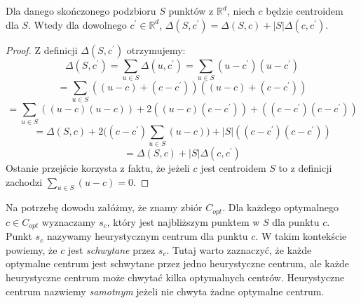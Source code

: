 \begin{lemma}{\cite{Arya2004LocalSH}}
    Dla danego skończonego podzbioru $S$ punktów z $\mathbb{R}^d$, niech $c$ będzie centroidem dla $S$. Wtedy dla dowolnego $c^{'} \in \mathbb{R}^d$, $\Delta(S, c^{'}) = \Delta(S, c) + |S|\Delta(c, c^{'})$.
\end{lemma}
\begin{proof}
    Z definicji $\Delta(S, c^{'})$ otrzymujemy:
    \begin{equation}
        \Delta(S, c^{'}) = \sum_{u \in S} \Delta(u, c^{'}) =  \sum_{u \in S} (u - c^{'}) (u - c^{'})
    \end{equation}
    \begin{equation}
         = \sum_{u \in S} ((u - c) + (c - c^{'})) ((u - c) + (c - c^{'}))
    \end{equation}
    \begin{equation}
        = \sum_{u \in S} ((u - c)(u - c)) + 2((u - c)(c - c^{'})) + ((c - c^{'})(c - c^{'}))
    \end{equation}
    \begin{equation}
        = \Delta(S, c) + 2\Big( (c - c^{'}) \sum_{u \in S} (u - c) \Big) + |S|((c - c^{'})(c - c^{'}))
    \end{equation}
    \begin{equation}
        = \Delta(S, c) + |S|\Delta(c,c^{'})
    \end{equation}
    Ostanie przejście korzysta z faktu, że jeżeli $c$ jest centroidem $S$ to z definicji zachodzi $\sum_{u \in S} (u - c) = 0$.
\end{proof}

\noindent
Na potrzebę dowodu załóżmy, że znamy zbiór $C_{opt}$.
Dla każdego optymalnego $c \in C_{opt}$ wyznaczamy $s_{c}$, który jest najbliższym punktem w $S$ dla punktu $c$.
Punkt $s_{c}$ nazywamy heurystycznym centrum dla punktu $c$.
W takim kontekście powiemy, że $c$ jest \textit{schwytane} przez $s_{c}$.
Tutaj warto zaznaczyć, że każde optymalne centrum jest schwytane przez jedno heurystyczne centrum, ale każde heurystyczne centrum może chwytać kilka optymalnych centrów.
Heurystyczne centrum nazwiemy \textit{samotnym} jeżeli nie chwyta żadne optymalne centrum.

